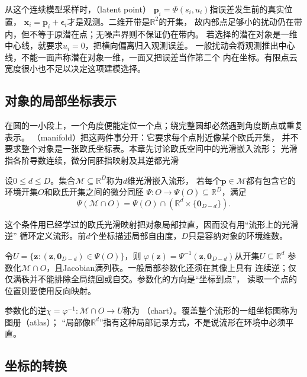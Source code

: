 从这个连续模型采样时，（latent point）
$\bm p_i=\Phi(s_i,u_i)$指误差发生前的真实位置，
$\bm x_i=\bm p_i+\bm\epsilon_i$才是观测。二维开带是$\mathbb R^2$的开集，
故内部点足够小的扰动仍在带内，但不等于原潜在点；无噪声界则不保证仍在带内。
若选择的潜在对象是一维中心线，就要求$u_i=0$，把横向偏离归入观测误差。
一般扰动会将观测推出中心线，不能一面声称潜在对象一维，一面又把误差当作第二个
内在坐标。有限点云宽度很小也不足以决定这项建模选择。

\subsection{对象的局部坐标表示}
\label{sec:geometry-manifold-coordinates}
\label{sec:geometry-local-coordinate-representation}

\label{sec:geometry-local-charts}

在圆的一小段上，一个角度便能定位一个点；绕完整圆却必然遇到角度断点或重复表示。
（manifold）把这两件事分开：它要求每个点附近像某个欧氏开集，
并不要求整个对象是一张欧氏坐标表。本章先讨论欧氏空间中的光滑嵌入流形；
光滑指各阶导数连续，微分同胚指映射及其逆都光滑

\begin{definition}[光滑嵌入流形]
\label{def:geometry-embedded-manifold}
设$0\leq d\leq D$。集合$\mathcal M\subseteq\mathbb R^D$称为$d$维光滑嵌入流形，
若每个$\bm p\in\mathcal M$都有包含它的环境开集$O$和欧氏开集之间的微分同胚
$\Psi:O\to\Psi(O)\subseteq\mathbb R^D$，满足
\[
 \Psi(\mathcal M\cap O)
 =\Psi(O)\cap(\mathbb R^d\times\{\bm0_{D-d}\}).
\]
\end{definition}
这个条件用已经学过的欧氏光滑映射把对象局部拉直，因而没有用“流形上的光滑逆”
循环定义流形。前$d$个坐标描述局部自由度，$D$只是容纳对象的环境维数。

令$U=\{\bm z:(\bm z,\bm0_{D-d})\in\Psi(O)\}$，则
$\varphi(\bm z)=\Psi^{-1}(\bm z,\bm0_{D-d})$从开集$U\subseteq\mathbb R^d$
参数化$\mathcal M\cap O$，且Jacobian满列秩。一般局部参数化还须在其像上具有
连续逆；仅仅满秩并不能排除全局绕回或自交。参数化的方向是“坐标到点”，
读取一个点的位置则要使用反向映射。


参数化的逆$\chi=\varphi^{-1}:\mathcal M\cap O\to U$称为
（chart）。覆盖整个流形的一组坐标图称为图册（atlas）；
“局部像$\mathbb R^d$”指有这种局部记录方式，不是说流形在环境中必须平直。

\subsection{坐标的转换}
\label{sec:geometry-coordinate-conversions}

